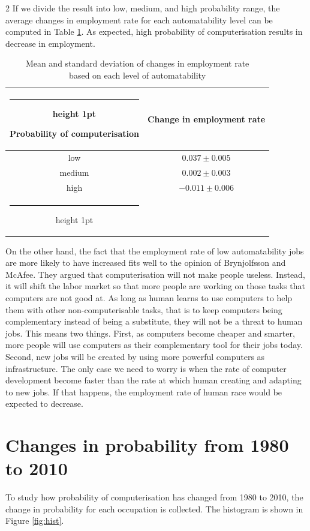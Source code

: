 \documentclass[11pt]{report}
\makeatletter
\newcommand{\thickhline}{%
    \noalign {\ifnum 0=`}\fi \hrule height 1pt
    \futurelet \reserved@a \@xhline
}
\numberwithin{equation}{chapter}
\makeatother
\begin{document}
\begin{spacing}{2}
If we divide the result into low, medium, and high probability range, the average changes in employment rate for each automatability level can be computed in Table \ref{tab:labor_change}. As expected, high probability of computerisation results in decrease in employment. 

\begin{table}
\centering
\begin{tabular}{c c}
\thickhline
Probability of computerisation & Change in employment rate \\ \hline
low                        & $0.037\pm 0.005 $                  \\
medium                     & $0.002\pm 0.003$                      \\
high                       & $-0.011\pm 0.006$                      \\ \thickhline
\end{tabular}
\centering
\caption{Mean and standard deviation of changes in employment rate \\based on each level of automatability}
\label{tab:labor_change}
\end{table} 

On the other hand, the fact that the employment rate of low automatability jobs are more likely to have increased fits well to the opinion of Brynjolfsson and McAfee\cite{brynjolfsson2012race}. They argued that computerisation will not make people useless. Instead, it will shift the labor market so that more people are working on those tasks that computers are not good at. As long as human learns to use computers to help them with other non-computerisable tasks, that is to keep computers being complementary instead of being a substitute, they will not be a threat to human jobs. This means two things. First, as computers become cheaper and smarter, more people will use computers as their complementary tool for their jobs today. Second, new jobs will be created by using more powerful computers as infrastructure. The only case we need to worry is when the rate of computer development become faster than the rate at which human creating and adapting to new jobs. If that happens, the employment rate of human race would be expected to decrease.


\section{Changes in probability from 1980 to 2010}
To study how probability of computerisation has changed from 1980 to 2010, the change in probability for each occupation is collected. The histogram is shown in Figure \ref{fig:hist}. 


\end{spacing}
\end{document}
